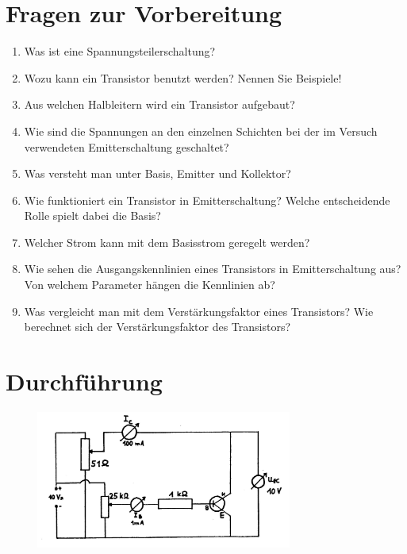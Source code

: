 \section{Fragen zur Vorbereitung}

\begin{enumerate}
	\item Was ist eine Spannungsteilerschaltung?
	\item Wozu kann ein Transistor benutzt werden? Nennen Sie Beispiele!
	\item Aus welchen Halbleitern wird ein Transistor aufgebaut?
	\item Wie sind die Spannungen an den einzelnen Schichten bei der im Versuch verwendeten Emitterschaltung geschaltet?
	\item Was versteht man unter Basis, Emitter und Kollektor?
	\item Wie funktioniert ein Transistor in Emitterschaltung? Welche entscheidende Rolle spielt dabei die Basis?
	\item Welcher Strom kann mit dem Basisstrom geregelt werden?
	\item Wie sehen die Ausgangskennlinien eines Transistors in Emitterschaltung aus? Von welchem Parameter hängen die Kennlinien ab?
	\item Was vergleicht man mit dem Verstärkungsfaktor eines Transistors? Wie berechnet sich der Verstärkungsfaktor des Transistors?
\end{enumerate}

\section{Durchführung} 

\begin{figure}[h]
	\centering
		\includegraphics[width=0.75\textwidth]{Abbildungen/BILD23.JPG}
	\label{fig:BILD23}
\end{figure}

